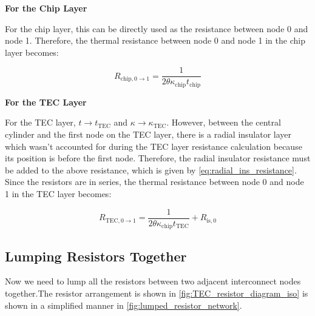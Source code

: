 \documentclass[10pt,a4paper,twocolumn]{article}
\begin{document}
\textbf{For the Chip Layer}

For the chip layer, this can be directly used as the resistance between node 0 and node 1. Therefore, the thermal resistance between node 0 and node 1 in the chip layer becomes:

\begin{equation}
  R_{\text{chip},0 \to 1} =  \frac{1}{2\theta \kappa_{\text{chip}} t_{\text{chip}}}
  \label{eq:R_chip_0_to_1}
\end{equation}

\textbf{For the TEC Layer}

For the TEC layer, $t\to t_{\text{TEC}}$ and $\kappa \to \kappa_{\text{TEC}}$. However, between the central cylinder and the first node on the TEC layer, there is a radial insulator layer which wasn't accounted for during the TEC layer resistance calculation because its position is before the first node. Therefore, the radial insulator resistance must be added to the above resistance, which is given by \cref{eq:radial_ins_resistance}. Since the resistors are in series, the thermal resistance between node 0 and node 1 in the TEC layer becomes:

\begin{equation}
  R_{\text{TEC},0 \to 1} = \frac{1}{2\theta \kappa_{\text{chip}} t_{\text{TEC}}} + R_{\text{is},0}
  \label{eq:R_TEC_0_to_1}
\end{equation}

\subsection{Lumping Resistors Together}

Now we need to lump all the resistors between two adjacent interconnect nodes together.The resistor arrangement is shown in \cref{fig:TEC_resistor_diagram_iso} is shown in a simplified manner in \cref{fig:lumped_resistor_network}.
\end{document}
